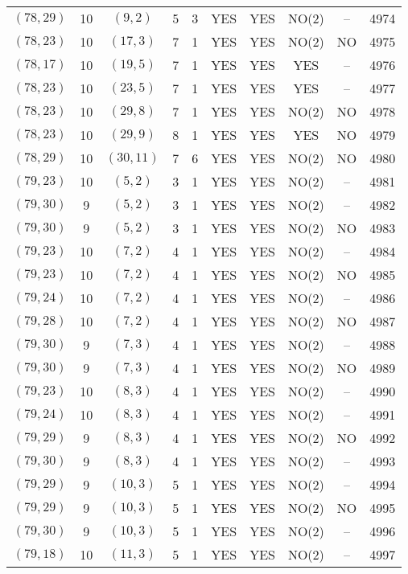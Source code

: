 \begin{longtable}{|c|c|c|c|c|c|c|c|c|c|}
$(78, 29)$ & 10 & $(9, 2)$ & 5 & 3 & YES & YES & NO(2) & -- & 4974\\
$(78, 23)$ & 10 & $(17, 3)$ & 7 & 1 & YES & YES & NO(2) & NO & 4975\\
$(78, 17)$ & 10 & $(19, 5)$ & 7 & 1 & YES & YES & YES & -- & 4976\\
$(78, 23)$ & 10 & $(23, 5)$ & 7 & 1 & YES & YES & YES & -- & 4977\\
$(78, 23)$ & 10 & $(29, 8)$ & 7 & 1 & YES & YES & NO(2) & NO & 4978\\
$(78, 23)$ & 10 & $(29, 9)$ & 8 & 1 & YES & YES & YES & NO & 4979\\
$(78, 29)$ & 10 & $(30, 11)$ & 7 & 6 & YES & YES & NO(2) & NO & 4980\\
$(79, 23)$ & 10 & $(5, 2)$ & 3 & 1 & YES & YES & NO(2) & -- & 4981\\
$(79, 30)$ & 9 & $(5, 2)$ & 3 & 1 & YES & YES & NO(2) & -- & 4982\\
$(79, 30)$ & 9 & $(5, 2)$ & 3 & 1 & YES & YES & NO(2) & NO & 4983\\
$(79, 23)$ & 10 & $(7, 2)$ & 4 & 1 & YES & YES & NO(2) & -- & 4984\\
$(79, 23)$ & 10 & $(7, 2)$ & 4 & 1 & YES & YES & NO(2) & NO & 4985\\
$(79, 24)$ & 10 & $(7, 2)$ & 4 & 1 & YES & YES & NO(2) & -- & 4986\\
$(79, 28)$ & 10 & $(7, 2)$ & 4 & 1 & YES & YES & NO(2) & NO & 4987\\
$(79, 30)$ & 9 & $(7, 3)$ & 4 & 1 & YES & YES & NO(2) & -- & 4988\\
$(79, 30)$ & 9 & $(7, 3)$ & 4 & 1 & YES & YES & NO(2) & NO & 4989\\
$(79, 23)$ & 10 & $(8, 3)$ & 4 & 1 & YES & YES & NO(2) & -- & 4990\\
$(79, 24)$ & 10 & $(8, 3)$ & 4 & 1 & YES & YES & NO(2) & -- & 4991\\
$(79, 29)$ & 9 & $(8, 3)$ & 4 & 1 & YES & YES & NO(2) & NO & 4992\\
$(79, 30)$ & 9 & $(8, 3)$ & 4 & 1 & YES & YES & NO(2) & -- & 4993\\
$(79, 29)$ & 9 & $(10, 3)$ & 5 & 1 & YES & YES & NO(2) & -- & 4994\\
$(79, 29)$ & 9 & $(10, 3)$ & 5 & 1 & YES & YES & NO(2) & NO & 4995\\
$(79, 30)$ & 9 & $(10, 3)$ & 5 & 1 & YES & YES & NO(2) & -- & 4996\\
$(79, 18)$ & 10 & $(11, 3)$ & 5 & 1 & YES & YES & NO(2) & -- & 4997\\

\end{longtable}
